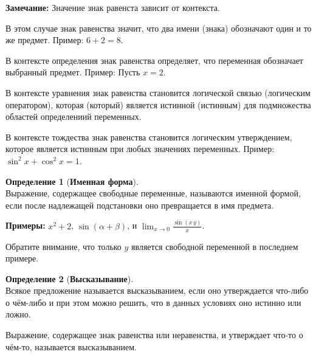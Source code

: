 \documentclass[fleqn,11pt]{article}
\theoremstyle{definition}
\newtheorem{definition}{Определение}
\newenvironment{tightdesc}{
\begin{description}
  \setlength{\itemsep}{1pt}
  \setlength{\parskip}{0pt}
  \setlength{\parsep}{0pt}}{\end{description}
}
\begin{document}
\begin{center}
  \begin{minipage}{.9\textwidth}
    \textbf{Замечание:} Значение знак равенста зависит от контекста.
      \begin{center}
      \begin{minipage}{.95\textwidth}
        \begin{tightdesc} %
          \item [Одно и то же:] В этом случае знак равенства значит, что два имени (знака) обозначают один и
          то же предмет. Пример: $6+2=8$.
          \item [Определение:] В контексте определения знак равенства определяет, что переменная обозначает выбранный предмет. Пример: Пусть $x = 2$.
          \item [Уравнение:] В контексте уравнения знак равенства становится логической связью (логическим
          оператором), которая (который) является истинной (истинным) для подмножества областей определениий переменных.
          \item [Тождество:] В контексте тождества знак равенства становится логическим утверждением, которое является
          истинным при любых значениях переменных. Пример: $\sin^2 x + \cos^2 x = 1$.
        \end{tightdesc}
      \end{minipage}
      \end{center}
  \end{minipage}
\end{center}

\begin{definition}[\textbf{Именная форма}] ~\\
	Выражение, содержащее свободные переменные, называются именной формой, если после надлежащей
	подстановки оно превращается в имя предмета.
\end{definition}
\begin{center}
	\begin{minipage}{.9\textwidth}
		\textbf{Примеры:} $x^2 + 2$, $\sin{(\alpha + \beta)}$, и $\lim_{x \to 0} \frac{\sin{(x\,y)}}{x}$.

		Обратите внимание, что только $y$ является свободной переменной в последнем примере.
	\end{minipage}
\end{center}

\begin{definition}[\textbf{Высказывание}] ~\\
	Всякое предложение называется высказыванием, если оно утверждается что-либо о чём-либо и при этом можно
	решить, что в данных условиях оно истинно или ложно.

	Выражение, содержащее знак равенства или неравенства, и утверждает что-то о чём-то,
	называется высказыванием.
\end{definition}
\end{document}
